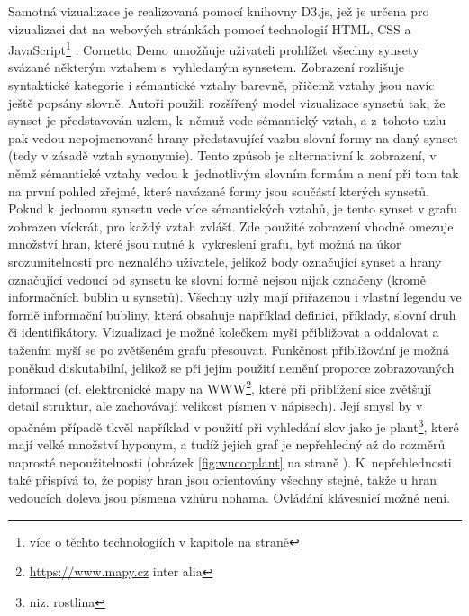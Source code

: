 \documentclass[a4paper, 11pt, oneside, showtrims]{book}
\newcommand{\itNameRef}[1]{\textit{\nameref{#1}}}
\newcommand\ex{\textsf}
\begin{document}
					Samotná vizualizace je realizovaná pomocí knihovny D3.js, jež je určena pro vizualizaci dat na webových stránkách pomocí technologií HTML, CSS a JavaScript\footnote{více o těchto technologiích v kapitole \itNameRef{cha:techno} na straně \pageref{cha:techno}} \parencite{d3web}. Cornetto Demo umožňuje uživateli prohlížet všechny synsety svázané některým vztahem s~vyhledaným synsetem. Zobrazení rozlišuje syntaktické kategorie i sémantické vztahy barevně, přičemž vztahy jsou navíc ještě popsány slovně. Autoři použili rozšířený model vizualizace synsetů tak, že synset je představován uzlem, k~němuž vede sémantický vztah, a z~tohoto uzlu pak vedou nepojmenované hrany představující vazbu slovní formy na daný synset (tedy v zásadě vztah synonymie). Tento způsob je alternativní k~zobrazení, v němž sémantické vztahy vedou k~jednotlivým slovním formám a není při tom tak na první pohled zřejmé, které navázané formy jsou součástí kterých synsetů. Pokud k~jednomu synsetu vede více sémantických vztahů, je tento synset v grafu zobrazen víckrát, pro každý vztah zvlášť. Zde použité zobrazení vhodně omezuje množství hran, které jsou nutné k~vykreslení grafu, byť možná na úkor srozumitelnosti pro neznalého uživatele, jelikož body označující synset a hrany označující vedoucí od synsetu ke slovní formě nejsou nijak označeny (kromě informačních bublin u synsetů). Všechny uzly mají přiřazenou i vlastní legendu ve formě informační bubliny, která obsahuje například definici, příklady, slovní druh či identifikátory. Vizualizaci je možné kolečkem myši přibližovat a oddalovat a tažením myší se po zvětšeném grafu přesouvat. Funkčnost přibližování je možná poněkud diskutabilní, jelikož se při jejím použití nemění proporce zobrazovaných informací (cf. elektronické mapy na WWW\footnote{\url{https://www.mapy.cz} inter alia}, které při přiblížení sice zvětšují detail struktur, ale zachovávají velikost písmen v nápisech). Její smysl by v opačném případě tkvěl například v použití při vyhledání slov jako je \ex{plant}\footnote{niz. \ex{rostlina}}, které mají velké množství hyponym, a tudíž jejich graf je nepřehledný až do rozměrů naprosté nepoužitelnosti (obrázek \ref{fig:wncorplant} na straně \pageref{fig:wncorplant}). K~nepřehlednosti také přispívá to, že popisy hran jsou orientovány všechny stejně, takže u hran vedoucích doleva jsou písmena vzhůru nohama. Ovládání klávesnicí možné není.
\end{document}
